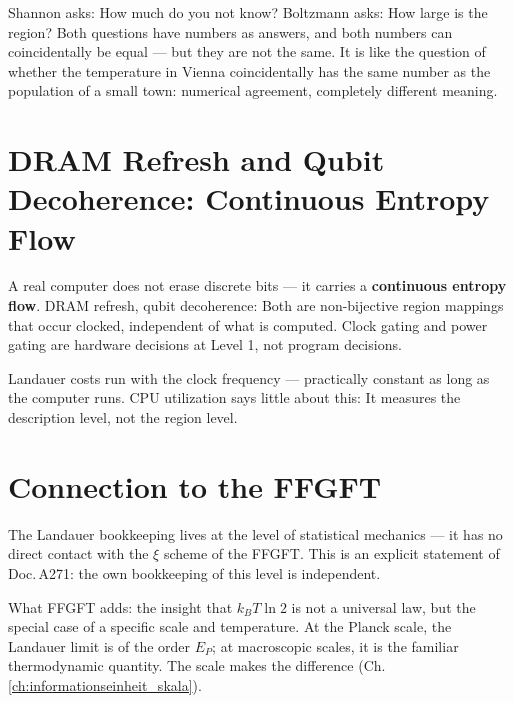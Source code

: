 \begin{laierspur}
Shannon asks: How much do you not know? Boltzmann asks: How large is the
region? Both questions have numbers as answers, and both numbers can
coincidentally be equal --- but they are not the same.
It is like the question of whether the temperature in Vienna coincidentally has the same number
as the population of a small town:
numerical agreement, completely different meaning.
\end{laierspur}

\section{DRAM Refresh and Qubit Decoherence: Continuous Entropy Flow}

A real computer does not erase discrete bits --- it carries a
\textbf{continuous entropy flow}. DRAM refresh, qubit decoherence:
Both are non-bijective region mappings that occur clocked,
independent of what is computed. Clock gating and power gating are
hardware decisions at Level 1, not program decisions. 

\begin{merkbox}[To Remember]
Landauer costs run with the clock frequency --- practically constant
as long as the computer runs. CPU utilization says little about this:
It measures the description level, not the region level.
\end{merkbox}

\section{Connection to the FFGFT}

The Landauer bookkeeping lives at the level of statistical mechanics ---
it has no direct contact with the $\xi$ scheme of the FFGFT.
This is an explicit statement of Doc.\,A271:
the own bookkeeping of this level is independent.

What FFGFT adds: the insight that $k_BT\ln 2$ is not a universal
law, but the special case of a specific scale and temperature.
At the Planck scale, the Landauer limit is of the order $E_P$;
at macroscopic scales, it is the familiar thermodynamic quantity.
The scale makes the difference (Ch.\,\ref{ch:informationseinheit_skala}).
